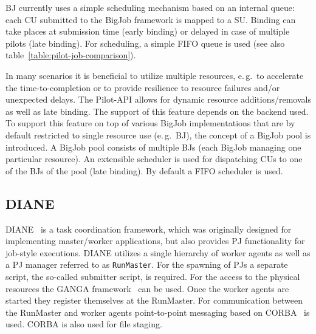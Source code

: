 \documentclass[conference,final]{IEEEtran}
\newcommand{\alnote}[1]{ {\textcolor{blue} { ***andrel: #1 }}}
\newcommand{\note}[1]{ {\textcolor{magenta} { ***Note: #1 }}}
\newcommand{\alnote}[1]{}
\newcommand{\note}[1]{}
\newcommand{\cu}{CU\xspace}
\newcommand{\cus}{CUs\xspace}
\newcommand{\upp}{\vspace*{-0.5em}}
\begin{document}
BJ currently uses a simple scheduling mechanism based on an internal queue: each
\cu submitted to the BigJob framework is mapped to a SU. Binding can take places
at submission time (early binding) or delayed in case of multiple pilots (late
binding). For scheduling, a simple FIFO queue is used (see also
table~\ref{table:pilot-job-comparison}).



In many scenarios it is beneficial to utilize multiple resources, e.\,g.\ to
accelerate the time-to-completion or to provide resilience to resource failures
and/or unexpected delays. The Pilot-API allows for dynamic resource
additions/removals as well as late binding. The support of this feature depends
on the backend used. To support this feature on top of various BigJob
implementations that are by default restricted to single resource use (e.\,g.\
BJ), the concept of a BigJob pool is introduced. A BigJob pool consists of
multiple BJs (each BigJob managing one particular resource). An extensible
scheduler is used for dispatching \cus to one of the BJs of the pool (late
binding). By default a FIFO scheduler is used.


\upp
\subsection{DIANE\upp\upp}

DIANE~\cite{Moscicki:908910} is a task coordination framework, which
was originally designed for implementing master/worker applications,
but also provides PJ functionality for job-style executions. DIANE
utilizes a single hierarchy of worker agents as well as a PJ manager
referred to as \texttt{RunMaster}.
For the spawning of PJs a separate script, the so-called submitter script, is
required. For the access to the physical resources the GANGA
framework~\cite{Moscicki20092303} can be used.
Once the worker agents are started they register themselves at the RunMaster.
For communication between the RunMaster and worker agents point-to-point
messaging based on CORBA~\cite{OMG-CORBA303:2004} is used. CORBA is also used
for file staging.
\end{document}
